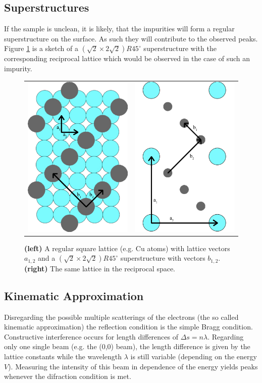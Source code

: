 \documentclass[a4paper]{scrartcl}
\numberwithin{equation}{section}
\numberwithin{figure}{section}
\numberwithin{table}{section}
\begin{document}
\subsection{Superstructures}
\label{sec:super}
If the sample is unclean, it is likely, that the impurities will form a regular superstructure on the surface. As such they will contribute to the observed peaks. Figure \ref{fig:superstructure} is a sketch of a $(\sqrt{2} \times 2\sqrt{2})R45^\circ$ superstructure with the corresponding reciprocal lattice which would be observed in the case of such an impurity.
\begin{figure}[!bthp]
        \begin{center}
        \begin{tabular}{l r}
        		\includegraphics[width=0.2\linewidth]{pic/superstructure.pdf}
       	&
       		\includegraphics[width=0.2\linewidth]{pic/superstructure2.pdf}
		  \end{tabular}
        \end{center}
        \caption{
			\small \textbf{(left)} A regular square lattice (e.g. Cu atoms) with lattice vectors $a_{1,2}$ and a  $(\sqrt{2} \times 2\sqrt{2})R45^\circ$ superstructure with vectors $b_{1,2}$.
			\textbf{(right)} The same lattice in the reciprocal space.
        }
        \label{fig:superstructure}
\end{figure}


\subsection{Kinematic Approximation}
Disregarding the possible multiple scatterings of the electrons (the so called kinematic approximation) the reflection condition is the simple Bragg condition. Constructive interference occurs for length differences of $\Delta s = n\lambda$. Regarding only one single beam (e.g. the (0,0) beam), the length difference is given by the lattice constants while the wavelength $\lambda$ is still variable (depending on the energy $V$). Measuring the intensity of this beam in dependence of the energy yields peaks whenever the difraction condition is met.
\end{document}
